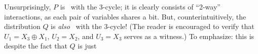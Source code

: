%
    Unsurprisingly, $P$ is \cible\ with the 3-cycle;
    it is clearly consists of ``2-way'' interactions, as each pair of variables shares a bit.
But, 
counterintuitively, 
the distribution $Q$ is \emph{also} \cible\ with the 3-cycle!
(The reader is encouraged to verify that 
    $U_1 = X_3 \oplus X_1$, $U_2 = X_2$, and $U_3 = X_3$
    serves as a witness.) 
To emphasize: this is despite the fact that $Q$ 
is just 

